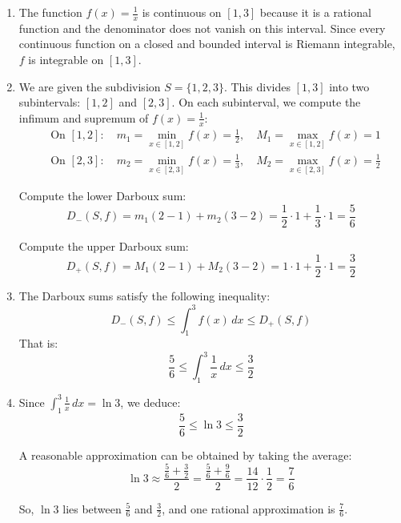 \documentclass[12pt]{article}
\begin{document}
\begin{answerbox}
\begin{enumerate}
  \item The function $ f(x) = \frac{1}{x} $ is continuous on $[1,3]$ because it is a rational function and the denominator does not vanish on this interval. Since every continuous function on a closed and bounded interval is Riemann integrable, $ f $ is integrable on $[1,3]$.

  \item We are given the subdivision $ S = \{1, 2, 3\} $. This divides $[1,3]$ into two subintervals: $[1,2]$ and $[2,3]$. On each subinterval, we compute the infimum and supremum of $ f(x) = \frac{1}{x} $:
  $$
  \begin{aligned}
      &\text{On } [1, 2]: \quad m_1 = \min_{x \in [1,2]} f(x) = \frac{1}{2}, \quad M_1 = \max_{x \in [1,2]} f(x) = 1 \\
      &\text{On } [2, 3]: \quad m_2 = \min_{x \in [2,3]} f(x) = \frac{1}{3}, \quad M_2 = \max_{x \in [2,3]} f(x) = \frac{1}{2}
  \end{aligned}
  $$

  Compute the lower Darboux sum:
  $$
  D_{-}(S, f) = m_1(2 - 1) + m_2(3 - 2) = \frac{1}{2} \cdot 1 + \frac{1}{3} \cdot 1 = \frac{5}{6}
  $$

  Compute the upper Darboux sum:
  $$
  D_{+}(S, f) = M_1(2 - 1) + M_2(3 - 2) = 1 \cdot 1 + \frac{1}{2} \cdot 1 = \frac{3}{2}
  $$

  \item The Darboux sums satisfy the following inequality:
  $$
  D_{-}(S, f) \leq \int_1^3 f(x)\,dx \leq D_{+}(S, f)
  $$
  That is:
  $$
  \frac{5}{6} \leq \int_1^3 \frac{1}{x}\,dx \leq \frac{3}{2}
  $$

  \item Since $ \int_1^3 \frac{1}{x}\,dx = \ln 3 $, we deduce:
  $$
  \frac{5}{6} \leq \ln 3 \leq \frac{3}{2}
  $$

  A reasonable approximation can be obtained by taking the average:
  $$
  \ln 3 \approx \frac{\frac{5}{6} + \frac{3}{2}}{2} = \frac{\frac{5}{6} + \frac{9}{6}}{2} = \frac{14}{12} \cdot \frac{1}{2} = \frac{7}{6}
  $$

  So, $ \ln 3 $ lies between $ \frac{5}{6} $ and $ \frac{3}{2} $, and one rational approximation is $ \frac{7}{6} $.
\end{enumerate}
\end{answerbox}

\newpage

\end{document}
